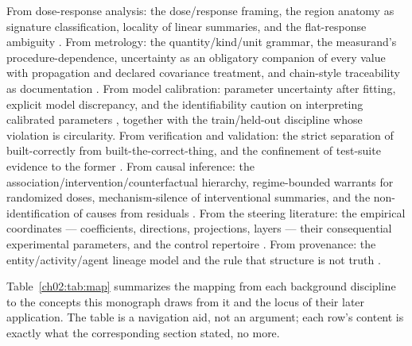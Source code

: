 From dose-response analysis: the dose/response framing, the region anatomy as signature classification, locality of linear summaries, and the flat-response ambiguity \cite{ritz}. From metrology: the quantity/kind/unit grammar, the measurand's procedure-dependence, uncertainty as an obligatory companion of every value with propagation and declared covariance treatment, and chain-style traceability as documentation \cite{vim,gum}. From model calibration: parameter uncertainty after fitting, explicit model discrepancy, and the identifiability caution on interpreting calibrated parameters \cite{kennedyohagan,brynjarsdottir}, together with the train/held-out discipline whose violation is circularity. From verification and validation: the strict separation of built-correctly from built-the-correct-thing, and the confinement of test-suite evidence to the former \cite{sargent}. From causal inference: the association/intervention/counterfactual hierarchy, regime-bounded warrants for randomized doses, mechanism-silence of interventional summaries, and the non-identification of causes from residuals \cite{pearl}. From the steering literature: the empirical coordinates --- coefficients, directions, projections, layers --- their consequential experimental parameters, and the control repertoire \cite{zourepe}. From provenance: the entity/activity/agent lineage model and the rule that structure is not truth \cite{prov}.

Table~\ref{ch02:tab:map} summarizes the mapping from each background discipline to the concepts this monograph draws from it and the locus of their later application. The table is a navigation aid, not an argument; each row's content is exactly what the corresponding section stated, no more.

